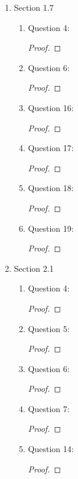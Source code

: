 \documentclass{article}
\begin{document}
\begin{enumerate}
\begin{enumerate}
\begin{proof}
          To find $\ker(\pi_1)$, we wish to find $(a,b)\in A\times B$ such
          that $pi_1((a,b))=a=1_A$. Clearly, we get
          $\ker(\pi_1)=\{1_A\}\times B$. Similarly for $\pi_2$, we get
          $\ker(\pi_2)=A\times\{1_B\}$.
        \end{proof}
    \end{enumerate}

  \item Section 1.7
    \begin{enumerate}
      \item Question 4:
        \begin{proof}
        \end{proof}

      \item Question 6:
        \begin{proof}
        \end{proof}

      \item Question 16:
        \begin{proof}
        \end{proof}

      \item Question 17:
        \begin{proof}
        \end{proof}

      \item Question 18:
        \begin{proof}
        \end{proof}

      \item Question 19:
        \begin{proof}
        \end{proof}
    \end{enumerate}

  \item Section 2.1
    \begin{enumerate}
      \item Question 4:
        \begin{proof}
        \end{proof}

      \item Question 5:
        \begin{proof}
        \end{proof}

      \item Question 6:
        \begin{proof}
        \end{proof}

      \item Question 7:
        \begin{proof}
        \end{proof}

      \item Question 14:
        \begin{proof}
        \end{proof}
    \end{enumerate}
\end{enumerate}
\end{document}
